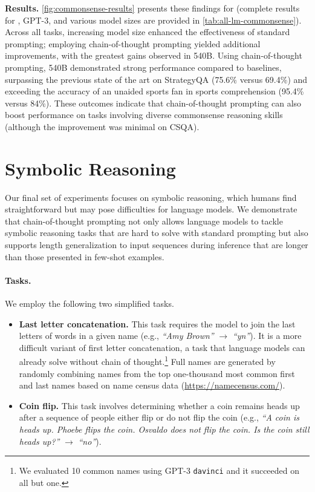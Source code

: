 \textbf{Results.}
\cref{fig:commonsense-results} presents these findings for \palm{} (complete results for \lamda{}, GPT-3, and various model sizes are provided in \cref{tab:all-lm-commonsense}).
Across all tasks, increasing model size enhanced the effectiveness of standard prompting; employing chain-of-thought prompting yielded additional improvements, with the greatest gains observed in \palm{} 540B. Using chain-of-thought prompting, \palm{} 540B demonstrated strong performance compared to baselines, surpassing the previous state of the art on StrategyQA (75.6\% versus 69.4\%) and exceeding the accuracy of an unaided sports fan in sports comprehension (95.4\% versus 84\%).
These outcomes indicate that chain-of-thought prompting can also boost performance on tasks involving diverse commonsense reasoning skills (although the improvement was minimal on CSQA).




\section{Symbolic Reasoning}\label{sec:symbolic-reasoning}
Our final set of experiments focuses on symbolic reasoning, which humans find straightforward but may pose difficulties for language models. We demonstrate that chain-of-thought prompting not only allows language models to tackle symbolic reasoning tasks that are hard to solve with standard prompting but also supports length generalization to input sequences during inference that are longer than those presented in few-shot examples.

\paragraph{Tasks.}
We employ the following two simplified tasks.

\begin{itemize}[leftmargin=*,topsep=0pt]
    \itemsep0em \item \textbf{Last letter concatenation.} This task requires the model to join the last letters of words in a given name (e.g., \textit{``Amy Brown''} $\rightarrow$ \textit{``yn''}). 
    It is a more difficult variant of first letter concatenation, a task that language models can already solve without chain of thought.\footnote{We evaluated 10 common names using GPT-3 \texttt{davinci} and it succeeded on all but one.} Full names are generated by randomly combining names from the top one-thousand most common first and last names based on name census data ({\small{\url{https://namecensus.com/}}}).
    \item \textbf{Coin flip.} This task involves determining whether a coin remains heads up after a sequence of people either flip or do not flip the coin (e.g., \textit{``A coin is heads up. Phoebe flips the coin. Osvaldo does not flip the coin. Is the coin still heads up?''} $\rightarrow$ \textit{``no''}).
\end{itemize}

